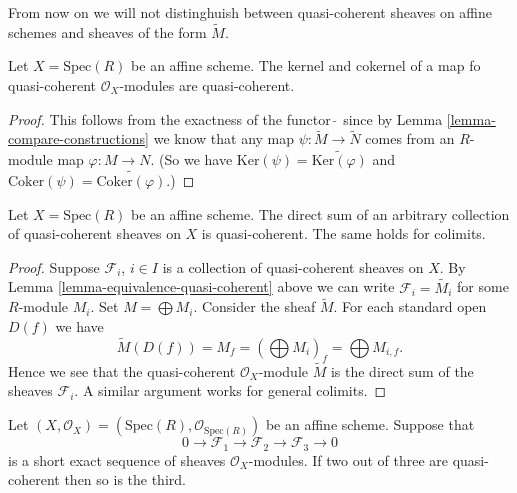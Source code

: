 \noindent
From now on we will not distinghuish between quasi-coherent
sheaves on affine schemes and sheaves of the form $\widetilde M$.

\begin{lemma}
\label{lemma-kernel-cokernel-quasi-coherent}
Let $X = \text{Spec}(R)$ be an affine scheme.
The kernel and cokernel of a map fo quasi-coherent
$\mathcal{O}_X$-modules are quasi-coherent.
\end{lemma}

\begin{proof}
This follows from the exactness of the functor $\widetilde{\ }$
since by Lemma \ref{lemma-compare-constructions} we know that any map
$\psi : \widetilde{M} \to \widetilde{N}$ comes from
an $R$-module map $\varphi : M \to N$. (So we have
$\text{Ker}(\psi) = \widetilde{\text{Ker}(\varphi)}$ and
$\text{Coker}(\psi) = \widetilde{\text{Coker}(\varphi)}$.)
\end{proof}

\begin{lemma}
\label{lemma-colimit-quasi-coherent}
Let $X = \text{Spec}(R)$ be an affine scheme.
The direct sum of an arbitrary collection of quasi-coherent sheaves
on $X$ is quasi-coherent. The same holds for colimits.
\end{lemma}

\begin{proof}
Suppose $\mathcal{F}_i$, $i \in I$ is a collection of quasi-coherent
sheaves on $X$. By Lemma \ref{lemma-equivalence-quasi-coherent}
above we can write $\mathcal{F}_i = \widetilde{M_i}$ for some $R$-module
$M_i$. Set $M = \bigoplus M_i$. Consider the sheaf $\widetilde{M}$.
For each standard open $D(f)$ we have
$$
\widetilde{M}(D(f)) = M_f =
\left(\bigoplus M_i\right)_f =
\bigoplus M_{i, f}.
$$
Hence we see that the quasi-coherent $\mathcal{O}_X$-module
$\widetilde{M}$ is the direct sum of the sheaves $\mathcal{F}_i$.
A similar argument works for general colimits.
\end{proof}

\begin{lemma}
\label{lemma-extension-quasi-coherent}
Let $(X, \mathcal{O}_X) = (\text{Spec}(R), \mathcal{O}_{\text{Spec}(R)})$
be an affine scheme. Suppose that
$$
0 \to
\mathcal{F}_1 \to
\mathcal{F}_2 \to
\mathcal{F}_3 \to
0
$$
is a short exact sequence of sheaves $\mathcal{O}_X$-modules.
If two out of three are quasi-coherent then so is the third.
\end{lemma}

